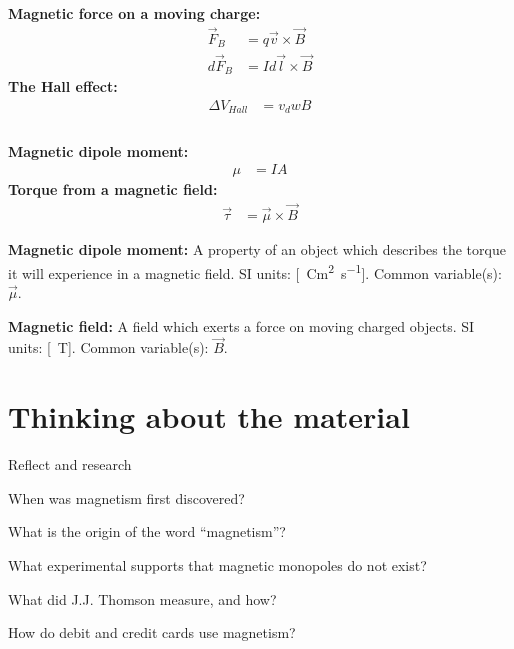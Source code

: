 \newpage
\begin{importantEquations}
\medskip
\begin{multicols}{2}
\textbf{Magnetic force on a moving charge:}
\begin{align*}
\vec F_B &= q\vec v\times \vec B\\
d\vec F_B &= I d\vec l \times \vec B
\end{align*}
\textbf{The Hall effect:}
\begin{align*}
\Delta V_{Hall} &= v_d w B \\
\end{align*}
\columnbreak
\\
\textbf{Magnetic dipole moment:}
\begin{align*}
\mu &= IA
\end{align*}
\textbf{Torque from a magnetic field:}
\begin{align*}
\vec \tau &= \vec \mu \times \vec B
\end{align*}
\medskip
\end{multicols}
\end{importantEquations}

\begin{definitions}
	\textbf{Magnetic dipole moment:} A property of an object which describes the torque it will experience in a magnetic field. SI units: [\SI{}{Cm^2s^{-1}}]. Common variable(s): $\vec \mu$.
	\item \textbf{Magnetic field:} A field which exerts a force on moving charged objects. SI units: [\SI{}{T}]. Common variable(s): $\vec B$.
\end{definitions}

\newpage
\section{Thinking about the material}

\begin{chapteractivity}{Reflect and research}
{
\item When was magnetism first discovered?
\item What is the origin of the word ``magnetism''?
\item What experimental supports that magnetic monopoles do not exist?
\item What did J.J. Thomson measure, and how?
\item How do debit and credit cards use magnetism?
}
\end{chapteractivity}

